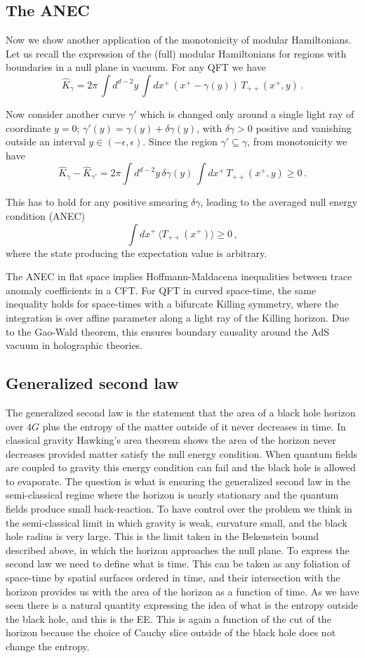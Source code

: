 \documentclass[12pt]{article}
\numberwithin{equation}{section}
\newcommand{\be}{\begin{equation}}
\newcommand{\ee}{\end{equation}}
\begin{document}
\subsection{The ANEC}
Now we show another application of the monotonicity of modular Hamiltonians. Let us recall the expression of the (full) modular Hamiltonians for regions with boundaries in a null plane in vacuum. For any QFT we have
\be
\hat{K}_\gamma=2\pi \, \int d^{d-2}y\, \int dx^+\, (x^+-\gamma(y)) \, T_{++}(x^+,y)\,. 
\ee

Now consider another curve $\gamma'$ which is changed only around a single light ray of coordinate $y=0$; $\gamma'(y)=\gamma(y)+\delta\gamma(y)$, with $\delta \gamma>0$ positive and vanishing outside an interval $y\in (-\epsilon,\epsilon)$. Since the region $\gamma'\subseteq \gamma$, from monotonicity we have
\be
\hat{K}_\gamma-\hat{K}_{\gamma'}=2 \pi\int d^{d-2}y\, \delta \gamma(y) \,\int dx^+\,  T_{++}(x^+,y)\ge 0\,.
\ee   

This has to hold for any positive smearing $\delta\gamma$, leading to the averaged null energy condition (ANEC)
\be
\int dx^+\,  \langle T_{++}(x^+)\rangle\ge 0\,,
\ee
where the state producing the expectation value is arbitrary. 

The ANEC in flat space implies Hoffmann-Maldacena inequalities between trace anomaly coefficients in a CFT. For QFT in curved space-time, the same inequality holds for space-times with a bifurcate Killing symmetry, where the integration is over affine parameter along a light ray of the Killing horizon. Due to the Gao-Wald theorem, this ensures boundary causality around the AdS vacuum in holographic theories.  

\subsection{Generalized second law}
The generalized second law is the statement that the area of a black hole horizon over $4G$ plus the entropy of the matter outside of it never decreases in time. In classical gravity  Hawking's area theorem shows the area of the horizon never decreases provided matter satisfy the null energy condition. When quantum fields are coupled to gravity this energy condition can fail and the black hole is allowed to evaporate. The question is what is ensuring the generalized second law in the semi-classical regime where the horizon is nearly stationary and the quantum fields produce small back-reaction.      
To have control over the problem we think in the semi-classical limit in which gravity is weak, curvature small, and the black hole radius is very large. This is the limit taken in the Bekenstein bound described above, in which the horizon approaches the null plane. To express the second law we need to define what is time. This can be taken as any foliation of space-time by spatial surfaces ordered in time, and their intersection with the horizon provides us with the area of the horizon as a function of time.  
As we have seen there is a natural quantity expressing the idea of what is the entropy outside the black hole, and this is the EE. This is again a function of the cut of the horizon because the choice of Cauchy slice outside of the black hole does not change the entropy.      
\end{document}
